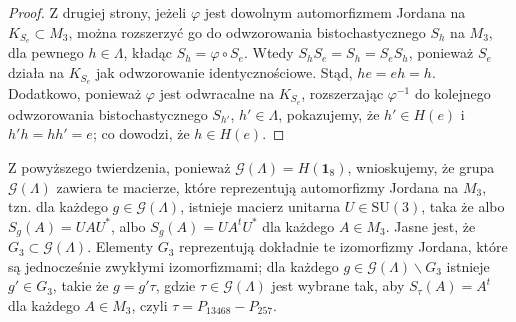 {\begin{proof}
Z drugiej strony, jeżeli $\varphi$ jest dowolnym automorfizmem Jordana na
$K_{S_{e}} \subset M_{3}$,
można rozszerzyć go do odwzorowania bistochastycznego $S_{h}$ na $M_{3}$,
dla pewnego $h \in \Lambda$,
kładąc $S_{h} = \varphi \circ S_{e}$.
Wtedy
    $S_{h} S_{e} = S_{h} = S_{e} S_{h}$,
ponieważ $S_{e}$ działa na $K_{S_{e}}$ jak odwzorowanie identycznościowe.
Stąd, $he = eh = h$.
Dodatkowo, ponieważ $\varphi$ jest odwracalne na $K_{S_{e}}$,
rozszerzając $\varphi^{-1}$ do kolejnego odwzorowania bistochastycznego
    $S_{h'}$,  $h' \in \Lambda$,
pokazujemy, że $h' \in H(e)$ i $h' h = h h' = e$;
co dowodzi, że $h \in H(e)$.
\end{proof}
\begin{Remark}
Z powyższego twierdzenia, ponieważ $\mathcal{G}(\Lambda) = H(\mathbf{1}_{8})$,
wnioskujemy, że grupa $\mathcal{G}(\Lambda)$ zawiera te macierze,
które reprezentują automorfizmy Jordana na $M_{3}$,
tzn. dla każdego $g \in \mathcal{G}(\Lambda)$,
istnieje macierz unitarna $U \in \text{SU}(3)$, taka że
albo $S_{g}(A) = U A U^{*}$, albo $S_{g}(A) = U A^{t} U^{*}$
dla każdego $A \in M_{3}$.
Jasne jest, że $G_{3} \subset \mathcal{G}(\Lambda)$.
Elementy $G_{3}$ reprezentują dokładnie te izomorfizmy Jordana,
które są jednocześnie zwykłymi izomorfizmami;
dla każdego $g \in \mathcal{G}(\Lambda) \backslash G_{3}$ istnieje
$g' \in G_{3}$, takie że $g = g' \tau$,
gdzie $\tau \in \mathcal{G}(\Lambda)$ jest wybrane tak, aby
$S_{\tau}(A) = A^{t}$ dla każdego $A \in M_{3}$,
czyli
$\tau = P_{13468} - P_{257}$.
\end{Remark}

}
